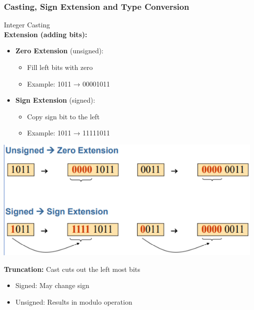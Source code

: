 \subsubsection{Casting, Sign Extension and Type Conversion}

\begin{definition}{Integer Casting}\\
\textbf{Extension (adding bits):}

\begin{minipage}{0.5\textwidth}
\begin{itemize}
  \item \textbf{Zero Extension} (unsigned):
    \begin{itemize}
      \item Fill left bits with zero
      \item Example: 1011 → 00001011
    \end{itemize}
\end{itemize}
\end{minipage}
\begin{minipage}{0.5\textwidth}
\begin{itemize}
  \item \textbf{Sign Extension} (signed):
    \begin{itemize}
      \item Copy sign bit to the left
      \item Example: 1011 → 11111011
    \end{itemize}
\end{itemize}
\end{minipage}

\includegraphics[width=0.7\linewidth]{images/sign_extension.png}

\textbf{Truncation:} Cast cuts out the left most bits
\begin{itemize}
  \item Signed: May change sign
  \item Unsigned: Results in modulo operation
\end{itemize}
\end{definition}


